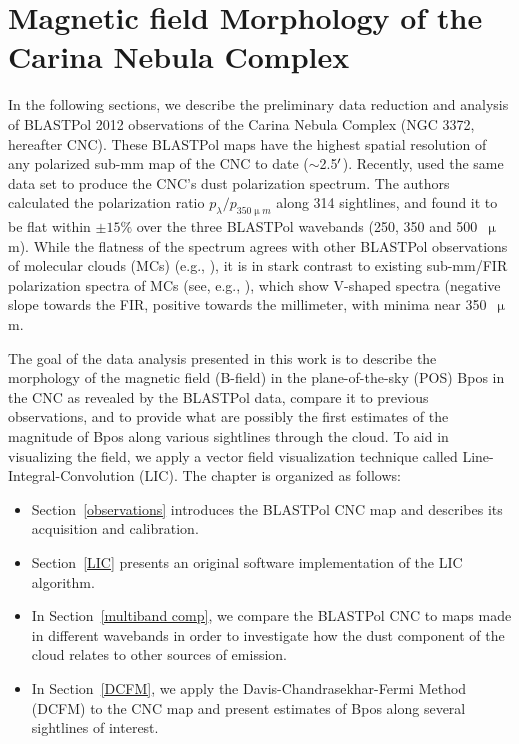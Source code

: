 \chapter{Magnetic field Morphology of the Carina Nebula Complex}\label{carina}

In the following sections, we describe the preliminary data reduction and analysis of BLASTPol 2012 \citep{galitzki2014balloon} observations of the Carina Nebula Complex (NGC 3372, hereafter CNC). These BLASTPol maps have the highest spatial resolution of any polarized sub-mm map of the CNC to date ($\sim$2.5$\operatorname{^{\prime}}$). Recently, \citet{shariff2015polarimetry} used the same data set to produce the CNC's dust polarization spectrum. The authors calculated the polarization ratio $p_\lambda/p_{350\upmu m}$ along 314 sightlines, and found it to be flat within $\pm 15\%$ over the three BLASTPol wavebands (250, 350 and 500~$\upmu$m). While the flatness of the spectrum agrees with other BLASTPol observations of molecular clouds (MCs) (e.g., \citet{ashton2018first,gandilo2016submillimeter}), it is in stark contrast to existing sub-mm/FIR polarization spectra of MCs (see, e.g., \citet{vaillancourt2012submillimeter}), which show V-shaped spectra (negative slope towards the FIR, positive towards the millimeter, with minima near 350~$\upmu$m.

The goal of the data analysis presented in this work is to describe the morphology of the magnetic field (B-field) in the plane-of-the-sky (POS) \gls{Bpos} in the CNC as revealed by the BLASTPol data, compare it to previous observations, and to provide what are possibly the first estimates of the magnitude of \gls{Bpos} along various sightlines through the cloud. To aid in visualizing the field, we apply a vector field visualization technique called Line-Integral-Convolution (LIC). The chapter is organized as follows:

\begin{itemize}[nosep]
  \item Section~\ref{observations} introduces the BLASTPol CNC map and describes its acquisition and calibration.
  \item Section~\ref{LIC} presents an original software implementation of the LIC algorithm.
  \item In Section~\ref{multiband comp}, we compare the BLASTPol CNC to maps made in different wavebands in order to investigate how the dust component of the cloud relates to other sources of emission.
  \item In Section~\ref{DCFM}, we apply the Davis-Chandrasekhar-Fermi Method (DCFM) to the CNC map and present estimates of \gls{Bpos} along several sightlines of interest.
\end{itemize}

